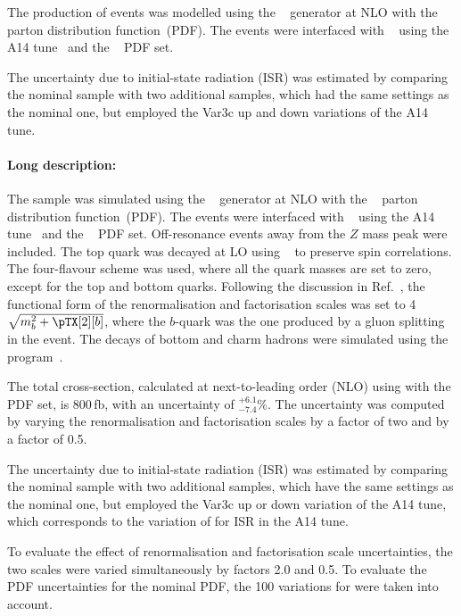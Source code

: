 The production of \tZq events was modelled using the \MGNLO[2.3.3]~\cite{Alwall:2014hca}
generator at NLO with the \NNPDF[3.0nlo]~\cite{Ball:2014uwa} parton distribution function~(PDF).
The events were interfaced with \PYTHIA[8.230]~\cite{Sjostrand:2014zea} using the A14 tune~\cite{ATL-PHYS-PUB-2014-021} and the
\NNPDF[2.3lo]~\cite{Ball:2014uwa} PDF set.

The uncertainty due to initial-state radiation (ISR) was estimated by comparing the nominal \tZq sample with two additional samples,
which had the same settings as the nominal one, but employed the Var3c up and down variations of the A14 tune. 


\paragraph{Long description:}

The \tZq sample was simulated using the \MGNLO[2.3.3]~\cite{Alwall:2014hca}
generator at NLO with the \NNPDF[3.0nlo]~\cite{Ball:2014uwa} parton distribution function~(PDF). The events were interfaced with
\PYTHIA[8.230]~\cite{Sjostrand:2014zea} using the A14 tune~\cite{ATL-PHYS-PUB-2014-021} 
and the \NNPDF[2.3lo]~\cite{Ball:2014uwa} PDF set. Off-resonance events away from the $Z$ mass peak were included. 
The top quark was decayed at LO using \MADSPIN~\cite{Frixione:2007zp,Artoisenet:2012st} to preserve spin correlations.
The four-flavour scheme was used, where all the quark masses are set to zero, except for the top and bottom quarks. 
Following the discussion in Ref.~\cite{Frederix:2012dh}, the functional form of the renormalisation and factorisation scales 
was set to 4$\sqrt{m_b^2+\pTX[2][b]}$, where the $b$-quark was the one produced by a gluon splitting in the event. 
The decays of bottom and charm hadrons were simulated using the \EVTGEN program~\cite{Lange:2001uf}.

The \tZq total cross-section, calculated at next-to-leading order (NLO) using \MGNLO[2.3.3] with the \NNPDF[3.0nlo] PDF set, 
is 800\,fb, with an uncertainty of $^{+6.1}_{-7.4}$\%. The uncertainty was computed by varying the renormalisation and 
factorisation scales by a factor of two and by a factor of 0.5.

The uncertainty due to initial-state radiation (ISR) was estimated by comparing the nominal \tZq sample with two additional samples,
which have the same settings as the nominal one, but employed the Var3c up or down variation of the A14 tune, which
corresponds to the variation of \alphas for ISR in the A14 tune.

To evaluate the effect of renormalisation and factorisation scale uncertainties, the two scales were varied simultaneously by factors 2.0 and 0.5.
To evaluate the PDF uncertainties for the nominal PDF, the 100 variations for \NNPDF[2.3lo] were taken into account. 
